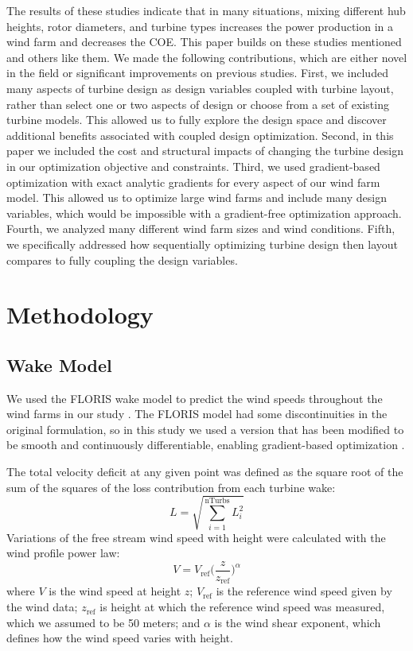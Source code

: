 \documentclass[WESD, manuscript]{copernicus}
\begin{document}
The results of these studies indicate that in many situations, mixing different hub heights, rotor diameters, and turbine types increases the power production in a wind farm and decreases the COE. This paper builds on these studies mentioned and others like them.
We made the following contributions, which are either novel in the field or significant improvements on previous studies.
First, we included many aspects of turbine design as design variables coupled with turbine layout, rather than select one or two aspects of design or choose from a set of existing turbine models. This allowed us to fully explore the design space and discover additional benefits associated with coupled design optimization.
Second, in this paper we included the cost and structural impacts of changing the turbine design in our optimization objective and constraints.
Third, we used gradient-based optimization with exact analytic gradients for every aspect of our wind farm model. This allowed us to optimize large wind farms and include many design variables, which would be impossible with a gradient-free optimization approach.
Fourth, we analyzed many different wind farm sizes and wind conditions.
Fifth, we specifically addressed how sequentially optimizing turbine design then layout compares to fully coupling the design variables.




\section{Methodology}

	\subsection{Wake Model}
	We used the FLORIS wake model to predict the wind speeds throughout the wind farms in our study \citep{gebraad2016wind}. 
The FLORIS model had some discontinuities in the original formulation, so in this study we used a version that has been modified to be smooth and continuously differentiable, enabling gradient-based optimization \citep{thomas2017improving}.

The total velocity deficit at any given point was defined as the square root of the sum of the squares of the loss contribution from each turbine wake:
\begin{equation}
L = \sqrt{\sum_{i=1}^\text{nTurbs}L_i^2}
\end{equation}
\noindent Variations of the free stream wind speed with height were calculated with the wind profile power law: 
\begin{equation}
V = V_{\text{ref}}\Big(\frac{z}{z_{\text{ref}}}\Big)^\alpha
\label{Eq:shear}
\end{equation}
where $V$ is the wind speed at height $z$; $V_{\text{ref}}$ is the reference wind speed given by the wind data; $z_{\text{ref}}$ is height at which the reference wind speed was measured, which we assumed to be 50 meters;  and $\alpha$ is the wind shear exponent, which defines how the wind speed varies with height.
      
\end{document}
